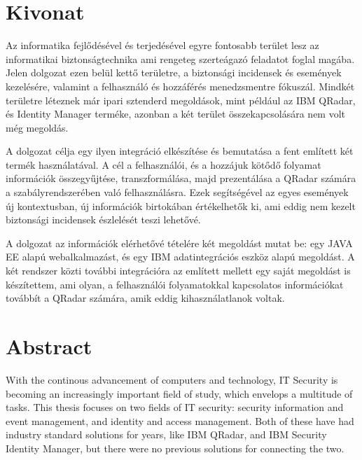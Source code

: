 \setcounter{page}{1}

\selecthungarian

\chapter*{Kivonat}

Az informatika fejlődésével és terjedésével egyre fontosabb terület lesz az informatikai biztonságtechnika ami rengeteg szerteágazó feladatot foglal magába. Jelen dolgozat ezen belül kettő területre, a biztonsági incidensek és események kezelésére, valamint a felhasználó és hozzáférés menedzsmentre fókuszál. Mindkét területre léteznek már ipari sztenderd megoldások, mint például az IBM QRadar, és Identity Manager terméke, azonban a két terület összekapcsolására nem volt még megoldás. 

A dolgozat célja egy ilyen integráció elkészítése és bemutatása a fent említett két termék használatával. A cél a felhasználói, és a hozzájuk kötődő folyamat információk összegyűjtése, transzformálása, majd prezentálása a QRadar számára a szabályrendszerében való felhasználásra. Ezek segítségével az egyes események új kontextusban, új információk birtokában értékelhetők ki, ami eddig nem kezelt biztonsági incidensek észlelését teszi lehetővé.


A dolgozat az információk elérhetővé tételére két megoldást mutat be: egy JAVA EE alapú webalkalmazást, és egy IBM adatintegrációs eszköz alapú megoldást. A két rendszer közti további integrációra az említett mellett egy saját megoldást is készítettem, ami olyan, a felhasználói folyamatokkal kapcsolatos információkat továbbít a QRadar számára,  amik eddig kihasználatlanok voltak.


\vfill
\selectenglish


\chapter*{Abstract}

With the continous advancement of computers and technology, IT Security is becoming an increasingly important field of study, which envelops a multitude of tasks. This thesis focuses on two fields of IT security: security information and event management, and identity and access management. Both of these have had industry standard solutions for years, like IBM QRadar, and IBM Security Identity Manager, but there were no previous solutions for connecting the two.

